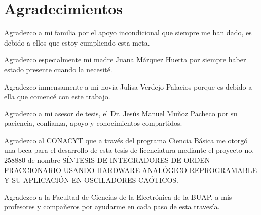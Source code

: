 \chapter{Agradecimientos}

Agradezco a mi familia por el apoyo incondicional que siempre me han dado, es debido a ellos que estoy cumpliendo esta meta.

Agradezco especialmente mi madre Juana Márquez Huerta por siempre haber estado presente cuando la necesité.

Agradezco inmensamente a mi novia Julisa Verdejo Palacios porque es debido a ella que comencé con este trabajo.

Agradezco a mi asesor de tesis, el Dr. Jesús Manuel Muñoz Pacheco por su paciencia, confianza, apoyo y conocimientos compartidos.

Agradezco al CONACYT que a través del programa Ciencia Básica me otorgó una beca para el desarrollo de esta tesis de licenciatura mediante el proyecto no. 258880 de nombre SÍNTESIS DE INTEGRADORES DE ORDEN FRACCIONARIO USANDO HARDWARE ANALÓGICO REPROGRAMABLE Y SU APLICACIÓN EN OSCILADORES CAÓTICOS.

Agradezco a la Facultad de Ciencias de la Electrónica de la BUAP, a mis profesores y compañeros por ayudarme en cada paso de esta travesía.

